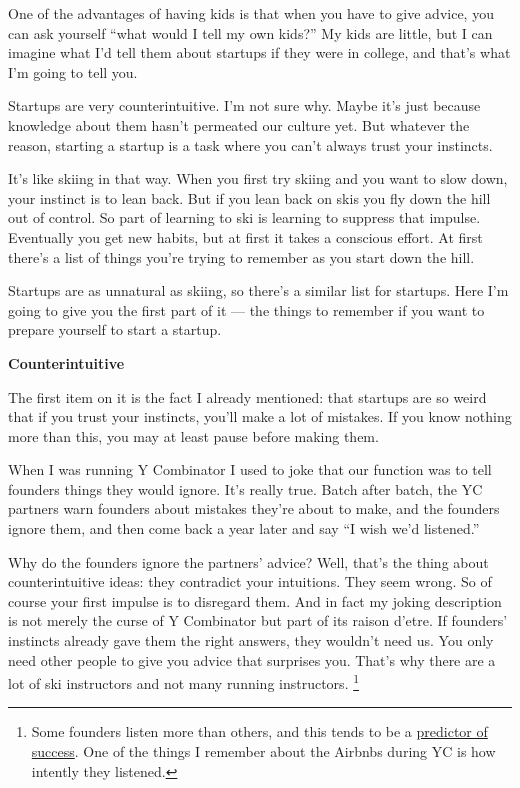 \documentclass[12pt]{book}
\begin{document}
One of the advantages of having kids is that when you have to give
advice, you can ask yourself ``what would I tell my own kids?'' My kids
are little, but I can imagine what I'd tell them about startups if they
were in college, and that's what I'm going to tell you.

Startups are very counterintuitive. I'm not sure why. Maybe it's just
because knowledge about them hasn't permeated our culture yet. But
whatever the reason, starting a startup is a task where you can't always
trust your instincts.

It's like skiing in that way. When you first try skiing and you want to
slow down, your instinct is to lean back. But if you lean back on skis
you fly down the hill out of control. So part of learning to ski is
learning to suppress that impulse. Eventually you get new habits, but at
first it takes a conscious effort. At first there's a list of things
you're trying to remember as you start down the hill.

Startups are as unnatural as skiing, so there's a similar list for
startups. Here I'm going to give you the first part of it --- the things
to remember if you want to prepare yourself to start a startup.

\textbf{Counterintuitive}

The first item on it is the fact I already mentioned: that startups are
so weird that if you trust your instincts, you'll make a lot of
mistakes. If you know nothing more than this, you may at least pause
before making them.

When I was running Y Combinator I used to joke that our function was to
tell founders things they would ignore. It's really true. Batch after
batch, the YC partners warn founders about mistakes they're about to
make, and the founders ignore them, and then come back a year later and
say ``I wish we'd listened.''

Why do the founders ignore the partners' advice? Well, that's the thing
about counterintuitive ideas: they contradict your intuitions. They seem
wrong. So of course your first impulse is to disregard them. And in fact
my joking description is not merely the curse of Y Combinator but part
of its raison d'etre. If founders' instincts already gave them the right
answers, they wouldn't need us. You only need other people to give you
advice that surprises you. That's why there are a lot of ski instructors
and not many running instructors. \footnote{Some founders listen more than others, and this tends to be a
\href{word.html}{predictor of success}. One of the things I remember
about the Airbnbs during YC is how intently they listened.}
\end{document}
